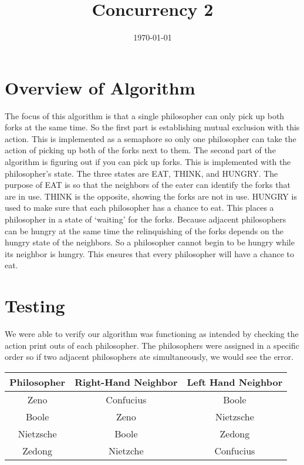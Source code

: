 \documentclass[letterpaper,10pt,titlepage]{article}
\title{Concurrency 2}
\author{\name}
\date{\today}
\begin{document}
	\maketitle
	\pagebreak

\section{Overview of Algorithm}
The focus of this algorithm is that a single philosopher can only pick up both forks at the same time. So the first part is establishing mutual exclusion with this action. This is implemented as a semaphore so only one philosopher can take the action of picking up both of the forks next to them. The second part of the algorithm is figuring out if you can pick up forks. This is implemented with the philosopher’s state. The three states are EAT, THINK, and HUNGRY. The purpose of EAT is so that the neighbors of the eater can identify the forks that are in use. THINK is the opposite, showing the forks are not in use. HUNGRY is used to make sure that each philosopher has a chance to eat. This places a philosopher in a state of ‘waiting’ for the forks. Because adjacent philosophers can be hungry at the same time the relinquishing of the forks depends on the hungry state of the neighbors. So a philosopher cannot begin to be hungry while its neighbor is hungry. This ensures that every philosopher will have a chance to eat.
\section{Testing}
We were able to verify our algorithm was functioning as intended by checking the action print outs of each philosopher. The philosophers were assigned in a specific order so if two adjacent philosophers ate simultaneously, we would see the error. 

\begin{tabular}{c | c | c}
	Philosopher & Right-Hand Neighbor & Left Hand Neighbor \\ \hline
	Zeno & Confucius & Boole \\ 
	Boole & Zeno & Nietzsche \\
	Nietzsche & Boole & Zedong \\
	Zedong & Nietzche & Confucius \\
\end{tabular}
\end{document}
